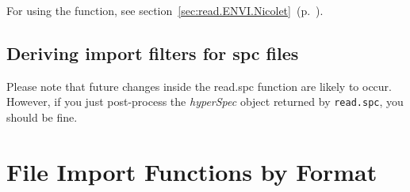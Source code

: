 \documentclass[english, a4paper, 10pt, headings=small, DIV11]{scrartcl}
\newcommand{\Rfunction}[2][]{\texorpdfstring{\nohyphens{#1\texttt{#2}}}{#2}}
\newcommand{\Rclass}[1]{\texorpdfstring{\nohyphens{\textit{#1}}}{#1}}
\newcommand{\chy}{\Rclass{hyperSpec}\xspace}
\begin{document}
For using the function, see section~\ref{sec:read.ENVI.Nicolet}~(p.~\pageref{sec:read.ENVI.Nicolet}).

\subsection{Deriving import filters for spc files}
Please note that future changes inside the read.spc function are likely to occur.
However, if you just post-process the \chy object returned by \Rfunction{read.spc}, you should be fine.




\clearpage
\appendix
\section{File Import  Functions by Format}
\label{sec:format}
\renewcommand{\arraystretch}{1.5}
\end{document}
